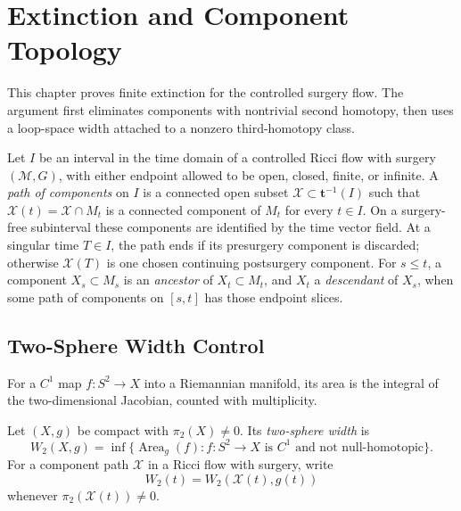 \chapter{Extinction and Component Topology}

This chapter proves finite extinction for the controlled surgery flow.  The
argument first eliminates components with nontrivial second homotopy, then
uses a loop-space width attached to a nonzero third-homotopy class.

\begin{definition}
\label{def:path-of-components}
\notready
Let $I$ be an interval in the time domain of a controlled Ricci flow with
surgery $({\mathcal M},G)$, with either endpoint allowed to be open, closed,
finite, or infinite.  A \emph{path of components} on $I$ is a connected open
subset ${\mathcal X}\subset\mathbf t^{-1}(I)$ such that
${\mathcal X}(t)={\mathcal X}\cap M_t$ is a connected component of $M_t$ for
every $t\in I$.  On a surgery-free subinterval these components are identified
by the time vector field.  At a singular time $T\in I$, the path ends if its
presurgery component is discarded; otherwise ${\mathcal X}(T)$ is one chosen
continuing postsurgery component.  For $s\le t$, a component
$X_s\subset M_s$ is an \emph{ancestor} of $X_t\subset M_t$, and $X_t$ a
\emph{descendant} of $X_s$, when some path of components on $[s,t]$ has those
endpoint slices.
\end{definition}

\section{Two-Sphere Width Control}

For a $C^1$ map $f\colon S^2\to X$ into a Riemannian manifold, its area is
the integral of the two-dimensional Jacobian, counted with multiplicity.

\begin{definition}
\label{def:two-sphere-width}
\notready
Let $(X,g)$ be compact with $\pi_2(X)\ne0$.  Its \emph{two-sphere width} is
\[
 W_2(X,g)=\inf\{\operatorname{Area}_g(f):f\colon S^2\to X\text{ is $C^1$ and not
 null-homotopic}\}.
\]
For a component path $\mathcal X$ in a Ricci flow with surgery, write
\[
 W_2(t)=W_2(\mathcal X(t),g(t))
\]
whenever
$\pi_2(\mathcal X(t))\ne0$.
\end{definition}

